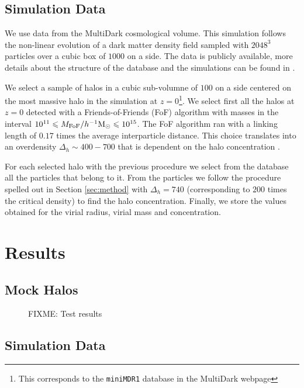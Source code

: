 \documentclass[useAMS,usenatbib]{mn2e}
\newcommand{\hMpc}{{\ifmmode{h^{-1}{\rm Mpc}}\else{$h^{-1}$Mpc }\fi}}
\newcommand{\hMsun}{{\ifmmode{h^{-1}{\rm
        {M_{\odot}}}}\else{$h^{-1}{\rm{M_{\odot}}}$~}\fi}}
\begin{document}
\subsection{Simulation Data}
\label{sec:data}

We use data from the MultiDark cosmological volume. This simulation
follows the non-linear evolution of a dark matter density field
sampled with $2048^3$ particles over a cubic box of $1000$ \hMpc on a
side. The data is publicly available, more details about the structure
of the database and the simulations can be found in
\citep{2013AN....334..691R}. 

We select a sample of halos in a cubic sub-volumne of $100$ \hMpc on a
side centered on the most massive halo in the simulation at
$z=0$\footnote{This corresponds to the \texttt{miniMDR1} database in
  the MultiDark webpage}. We select first all the halos at $z=0$
detected with a Friends-of-Friends (FoF) algorithm with masses in the
interval $10^{11}\leq M_{\rm FoF}/\hMsun \leq 10^{15}$. The FoF
algorithm ran with a linking length of $0.17$ times the average
interparticle distance. This choice translates into an overdensity
$\Delta_h\sim 400-700$ that is dependent on the halo concentration
\citep{More2011}.

For each selected halo with the previous procedure we select from the database
all the particles that belong to it. From the particles we follow the
procedure spelled out in Section \ref{sec:method} with $\Delta_h=740$
(corresponding to $200$ times the critical density) to find the
halo concentration. Finally, we store the values obtained for the
virial radius, virial mass and concentration. 


\section{Results}
\label{sec:results}


\subsection{Mock Halos}
\label{sec:results_mocks}
\begin{figure}[H]
\caption{FIXME: Test results}
\end{figure}



\subsection{Simulation Data}
\label{sec:results_mocks}
\end{document}
